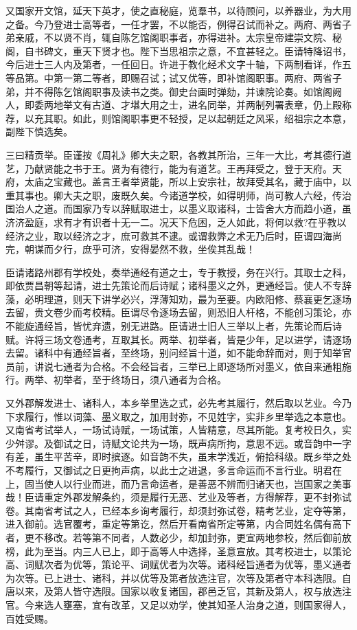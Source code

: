 \documentclass[UTF8,titlepage,oneside]{ctexbook}
\begin{document}
又国家开文馆，延天下英才，使之直秘庭，览羣书，以待顾问，以养器业，为大用之备。今乃登进士高等者，一任才罢，不以能否，例得召试而补之。两府、两省子弟亲戚，不以贤不肖，辄自陈乞馆阁职事者，亦得进补。太宗皇帝建崇文院、秘阁，自书碑文，重天下贤才也。陛下当思祖宗之意，不宜甚轻之。臣请特降诏书，今后进士三人内及第者，一任回日。许进于教化经术文字十轴，下两制看详，作五等品第。中第一第二等者，即赐召试；试又优等，即补馆阁职事。两府、两省子弟，并不得陈乞馆阁职事及读书之类。御史台画时弹劾，并谏院论奏。如馆阁阙人，即委两地举文有古道、才堪大用之士，进名同举，并两制列署表章，仍上殿称荐，以充其职。如此，则馆阁职事更不轻授，足以起朝廷之风采，绍祖宗之本意，副陛下慎选矣。


三曰精贡举。臣谨按《周礼》卿大夫之职，各教其所治，三年一大比，考其德行道艺，乃献贤能之书于王。贤为有德行，能为有道艺。王再拜受之，登于天府。天府，太庙之宝藏也。盖言王者举贤能，所以上安宗社，故拜受其名，藏于庙中，以重其事也。卿大夫之职，废既久矣。今诸道学校，如得明师，尚可教人六经，传治国治人之道。而国家乃专以辞赋取进士，以墨义取诸科，士皆舍大方而趋小道，虽济济盈庭，求有才有识者十无一二。况天下危困，乏人如此，将何以救?在乎教以经济之业，取以经济之才，庶可救其不逮。或谓救弊之术无乃后时，臣谓四海尚完，朝谋而夕行，庶乎可济，安得晏然不救，坐俟其乱哉！


臣请诸路州郡有学校处，奏举通经有道之士，专于教授，务在兴行。其取士之科，即依贾昌朝等起请，进士先策论而后诗赋；诸科墨义之外，更通经旨。使人不专辞藻，必明理道，则天下讲学必兴，浮薄知劝，最为至要。内欧阳修、蔡襄更乞逐场去留，贵文卷少而考校精。臣谓尽令逐场去留，则恐旧人杆格，不能创习策论，亦不能旋通经旨，皆忧弃遗，别无进路。臣请进士旧人三举以上者，先策论而后诗赋。许将三场文卷通考，互取其长。两举、初举者，皆是少年，足以进学，请逐场去留。诸科中有通经旨者，至终场，别问经旨十道，如不能命辞而对，则于知举官员前，讲说七通者为合格。不会经旨者，三举已上即逐场所对墨义，依自来通粗施行。两举、初举者，至于终场日，须八通者为合格。


又外郡解发进士、诸科人，本乡举里选之式，必先考其履行，然后取以艺业。今乃下求履行，惟以词藻、墨义取之，加用封弥，不见姓字，实非乡里举选之本意也。又南省考试举人，一场试诗赋，一场试策，人皆精意，尽其所能。复考校日久，实少舛谬。及御试之日，诗赋文论共为一场，既声病所拘，意思不远。或音韵中一字有差，虽生平苦辛，即时摈逐。如音韵不失，虽末学浅近，俯拾科级。既乡举之处不考履行，又御试之日更拘声病，以此士之进退，多言命运而不言行业。明君在上，固当使人以行业而进，而乃言命运者，是善恶不辨而归诸天也，岂国家之美事哉！臣请重定外郡发解条约，须是履行无恶、艺业及等者，方得解荐，更不封弥试卷。其南省考试之人，已经本乡询考履行，却须封弥试卷，精考艺业，定夺等第，进入御前。选官覆考，重定等第讫，然后开看南省所定等第，内合同姓名偶有高下者，更不移改。若等第不同者，人数必少，却加封弥，更宣两地参校，然后御前放榜，此为至当。内三人已上，即于高等人中选择，圣意宣放。其考校进士，以策论高、词赋次者为优等，策论平、词赋优者为次等。诸科经旨通者为优等，墨义通者为次等。已上进士、诸科，并以优等及第者放选注官，次等及第者守本科选限。自唐以来，及第人皆守选限。国家以收复诸国，郡邑乏官，其新及第人，权与放选注官。今来选人壅塞，宜有改革，又足以劝学，使其知圣人治身之道，则国家得人，百姓受赐。
\end{document}
